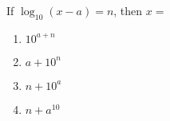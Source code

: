 \bigskip

\item If $\log_{10} (x-a) = n$, then $x=$

\begin{enumerate}
\item $10^{a+n}$
\item $a + 10^n$
\item $n + 10^a$
\item $n + a^{10}$
\end{enumerate}

